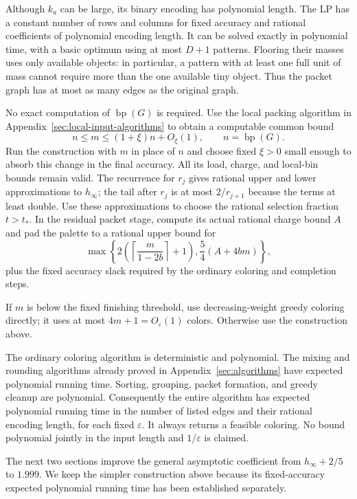\documentclass[11pt]{article}
\theoremstyle{definition}\newtheorem{algorithm}{Algorithm}[section]
\numberwithin{equation}{section}
\theoremstyle{remark}\newtheorem*{remark}{Remark}
\newcommand{\bp}{\operatorname{bp}}
\begin{document}
Although $k_a$ can be large, its binary encoding has polynomial
length. The LP has a constant number of rows and columns for fixed
accuracy and rational coefficients of polynomial encoding length.
It can be solved exactly in polynomial time, with a basic optimum
using at most $D+1$ patterns. Flooring their masses uses only available
objects: in particular, a pattern with at least one full unit of mass
cannot require more than the one available tiny object. Thus the
packet graph has at most as many edges as the original graph.

No exact computation of $\bp(G)$ is required. Use the local packing
algorithm in Appendix~\ref{sec:local-input-algorithms} to obtain a
computable common bound
\[
 n\le m\le(1+\xi)n+O_\xi(1),\qquad n=\bp(G).
\]
Run the construction with $m$ in place of $n$ and choose fixed
$\xi>0$ small enough to absorb this change in the final accuracy.
All its load, charge, and local-bin bounds remain valid.  The recurrence
for $r_j$ gives rational upper and lower approximations to $h_\infty$;
the tail after $r_j$ is at most $2/r_{j+1}$ because the terms at least
double.  Use these approximations to choose the rational selection
fraction $t>t_*$.  In the residual packet stage, compute its actual
rational charge bound $A$ and pad the palette to a rational upper bound
for
\[
 \max\left\{2\left(\left\lceil\frac{m}{1-2b}\right\rceil+1\right),
                  \frac54(A+4bm)\right\},
\]
plus the fixed accuracy slack required by the ordinary coloring and
completion steps.

If $m$ is below the fixed finishing threshold, use decreasing-weight
greedy coloring directly; it uses at most $4m+1=O_\varepsilon(1)$
colors. Otherwise use the construction above.

The ordinary coloring algorithm is deterministic and polynomial.
The mixing and rounding algorithms already proved in
Appendix~\ref{sec:algorithms} have expected polynomial running time.
Sorting, grouping, packet formation, and
greedy cleanup are polynomial. Consequently the entire algorithm has
expected polynomial running time in the number of listed edges and
their rational encoding length, for each fixed $\varepsilon$.
It always returns a feasible coloring. No bound polynomial jointly
in the input length and $1/\varepsilon$ is claimed.

The next two sections improve the general asymptotic coefficient
from $h_\infty+2/5$ to $1.999$. We keep the simpler construction above
because its fixed-accuracy expected polynomial running time has been
established separately.
\end{document}
